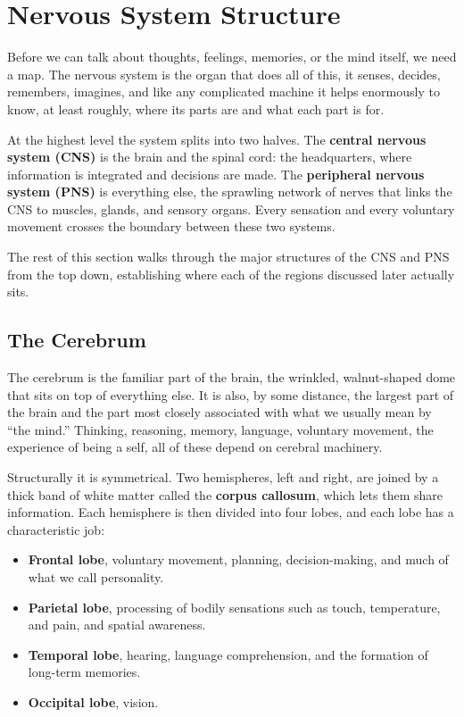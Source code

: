 \documentclass[11pt]{article}
\begin{document}
\section{Nervous System Structure}

Before we can talk about thoughts, feelings, memories, or the mind itself, we need a map. The nervous system is the organ that does all of this, it senses, decides, remembers, imagines, and like any complicated machine it helps enormously to know, at least roughly, where its parts are and what each part is for.

At the highest level the system splits into two halves. The \textbf{central nervous system (CNS)} is the brain and the spinal cord: the headquarters, where information is integrated and decisions are made. The \textbf{peripheral nervous system (PNS)} is everything else, the sprawling network of nerves that links the CNS to muscles, glands, and sensory organs. Every sensation and every voluntary movement crosses the boundary between these two systems.

The rest of this section walks through the major structures of the CNS and PNS from the top down, establishing where each of the regions discussed later actually sits.

\subsection{The Cerebrum}

The cerebrum is the familiar part of the brain, the wrinkled, walnut-shaped dome that sits on top of everything else. It is also, by some distance, the largest part of the brain and the part most closely associated with what we usually mean by ``the mind.'' Thinking, reasoning, memory, language, voluntary movement, the experience of being a self, all of these depend on cerebral machinery.

Structurally it is symmetrical. Two hemispheres, left and right, are joined by a thick band of white matter called the \textbf{corpus callosum}, which lets them share information. Each hemisphere is then divided into four lobes, and each lobe has a characteristic job:

\begin{itemize}
    \item \textbf{Frontal lobe}, voluntary movement, planning, decision-making, and much of what we call personality.
    \item \textbf{Parietal lobe}, processing of bodily sensations such as touch, temperature, and pain, and spatial awareness.
    \item \textbf{Temporal lobe}, hearing, language comprehension, and the formation of long-term memories.
    \item \textbf{Occipital lobe}, vision.
\end{itemize}
\end{document}

